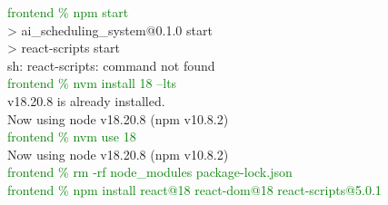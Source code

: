 \documentclass[12pt, a4paper]{article}
\begin{document}
        \begin{monoblock}
            \textcolor{green}{frontend \% npm start} \\
            
            > ai\_scheduling\_system@0.1.0 start \\
            > react-scripts start \\
            
            sh: react-scripts: command not found \\
            
            \textcolor{green}{frontend \% nvm install 18 --lts} \\
            
            v18.20.8 is already installed. \\
            Now using node v18.20.8 (npm v10.8.2) \\
            
            \textcolor{green}{frontend \% nvm use 18} \\
            
            Now using node v18.20.8 (npm v10.8.2) \\
            
            \textcolor{green}{frontend \% rm -rf node\_modules package-lock.json} \\
            
            \textcolor{green}{frontend \% npm install react@18 react-dom@18 react-scripts@5.0.1} \\
            

\end{monoblock}
\end{document}
